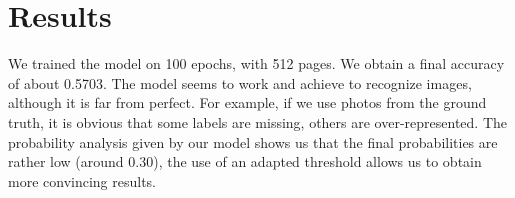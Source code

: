 \documentclass[10pt,conference,compsocconf]{IEEEtran}
\begin{document}
\section{Results}
We trained the model on 100 epochs, with 512 pages. We obtain a final accuracy of about 0.5703. The model seems to work and achieve to recognize images, although it is far from perfect. For example, if we use photos from the ground truth, it is obvious that some labels are missing, others are over-represented. The probability analysis given by our model shows us that the final probabilities are rather low (around 0.30), the use of an adapted threshold allows us to obtain more convincing results.
\end{document}
